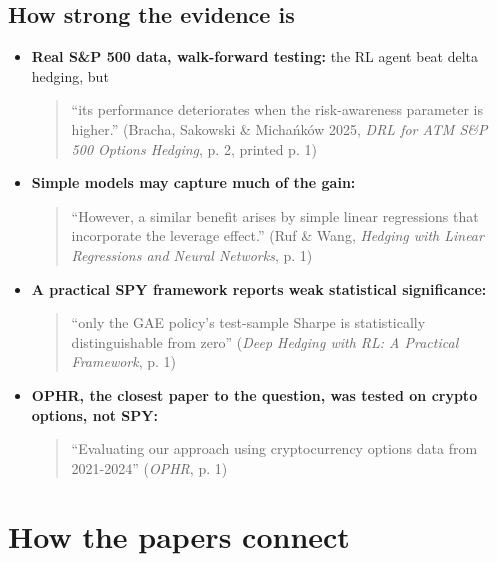 \documentclass{article}
\begin{document}
\subsection{How strong the evidence is}

\begin{itemize}

\item \textbf{Real S\&P 500 data, walk-forward testing:} the RL agent beat delta hedging, but

\begin{quote}``its performance deteriorates when the risk-awareness parameter is higher.'' (Bracha, Sakowski \& Michańków 2025, \emph{DRL for ATM S\&P 500 Options Hedging}, p. 2, printed p. 1)\end{quote}

\item \textbf{Simple models may capture much of the gain:}

\begin{quote}``However, a similar benefit arises by simple linear regressions that incorporate the leverage effect.'' (Ruf \& Wang, \emph{Hedging with Linear Regressions and Neural Networks}, p. 1)\end{quote}

\item \textbf{A practical SPY framework reports weak statistical significance:}

\begin{quote}``only the GAE policy's test-sample Sharpe is statistically distinguishable from zero'' (\emph{Deep Hedging with RL: A Practical Framework}, p. 1)\end{quote}

\item \textbf{OPHR, the closest paper to the question, was tested on crypto options, not SPY:}

\begin{quote}``Evaluating our approach using cryptocurrency options data from 2021-2024'' (\emph{OPHR}, p. 1)\end{quote}

\end{itemize}

\section{How the papers connect}
\end{document}
